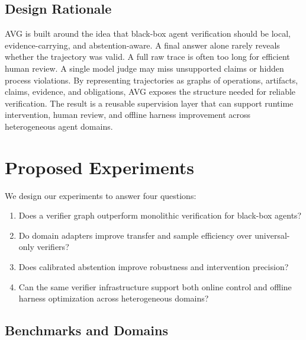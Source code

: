 \documentclass{article} %
\newcommand{\AVG}{\textsc{AVG}\xspace}
\begin{document}
\subsection{Design Rationale}

\AVG is built around the idea that black-box agent verification should be local, evidence-carrying, and abstention-aware. A final answer alone rarely reveals whether the trajectory was valid. A full raw trace is often too long for efficient human review. A single model judge may miss unsupported claims or hidden process violations. By representing trajectories as graphs of operations, artifacts, claims, evidence, and obligations, \AVG exposes the structure needed for reliable verification. The result is a reusable supervision layer that can support runtime intervention, human review, and offline harness improvement across heterogeneous agent domains.


\section{Proposed Experiments}
\label{sec:experiments}

We design our experiments to answer four questions:
\begin{enumerate}[leftmargin=1.3em]
    \item Does a verifier graph outperform monolithic verification for black-box agents?
    \item Do domain adapters improve transfer and sample efficiency over universal-only verifiers?
    \item Does calibrated abstention improve robustness and intervention precision?
    \item Can the same verifier infrastructure support both online control and offline harness optimization across heterogeneous domains?
\end{enumerate}

\subsection{Benchmarks and Domains}
\label{subsec:benchmarks}
\end{document}
